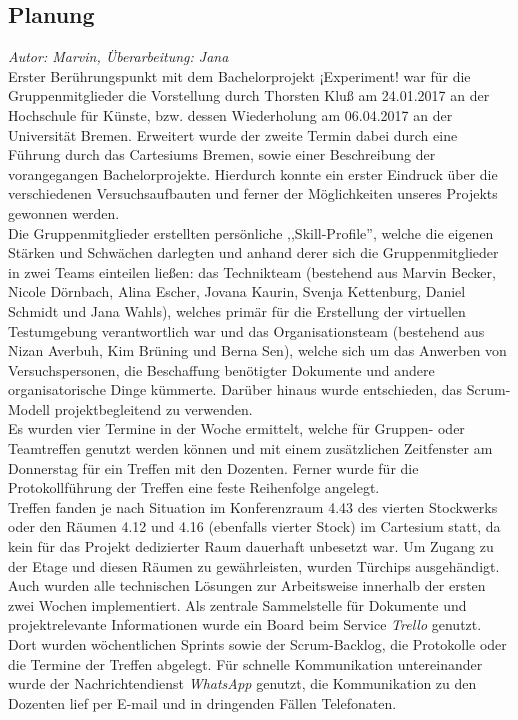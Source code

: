 \documentclass{Bericht}
\begin{document}
\subsection{Planung} %
\textit{Autor: Marvin, Überarbeitung: Jana}\\
		Erster Berührungspunkt mit dem Bachelorprojekt ¡Experiment! war für die Gruppenmitglieder die Vorstellung durch Thorsten Kluß am 24.01.2017 an der Hochschule für Künste, bzw. dessen Wiederholung am 06.04.2017 an der Universität Bremen. Erweitert wurde der zweite Termin dabei durch eine Führung durch das Cartesiums Bremen, sowie einer Beschreibung der vorangegangen Bachelorprojekte. Hierdurch konnte ein erster Eindruck über die verschiedenen Versuchsaufbauten und ferner der Möglichkeiten unseres Projekts gewonnen werden.\\
Die Gruppenmitglieder erstellten persönliche ,,Skill-Profile'', welche die eigenen Stärken und Schwächen darlegten und anhand derer sich die Gruppenmitglieder in zwei Teams einteilen ließen: das Technikteam (bestehend aus Marvin Becker, Nicole Dörnbach, Alina Escher, Jovana Kaurin, Svenja Kettenburg, Daniel Schmidt und Jana Wahls), welches primär für die Erstellung der virtuellen Testumgebung verantwortlich war und das Organisationsteam (bestehend aus Nizan Averbuh, Kim Brüning und Berna Sen), welche sich um das Anwerben von Versuchspersonen, die Beschaffung benötigter Dokumente und andere organisatorische Dinge kümmerte.
Darüber hinaus wurde entschieden, das Scrum-Modell projektbegleitend zu verwenden.\\
Es wurden vier Termine in der Woche ermittelt, welche für Gruppen- oder Teamtreffen genutzt werden können und mit einem zusätzlichen Zeitfenster am Donnerstag für ein Treffen mit den Dozenten. Ferner wurde für die Protokollführung der Treffen eine feste Reihenfolge angelegt.\\
Treffen fanden je nach Situation im Konferenzraum 4.43 des vierten Stockwerks oder den Räumen 4.12 und 4.16 (ebenfalls vierter Stock) im Cartesium statt, da kein für das Projekt dedizierter Raum dauerhaft unbesetzt war. Um Zugang zu der Etage und diesen Räumen zu gewährleisten, wurden Türchips ausgehändigt.\\
Auch wurden alle technischen Lösungen zur Arbeitsweise innerhalb der ersten zwei Wochen implementiert. Als zentrale Sammelstelle für Dokumente und projektrelevante Informationen wurde ein Board beim Service \textit{Trello} genutzt. Dort wurden wöchentlichen Sprints sowie der Scrum-Backlog, die Protokolle oder die Termine der Treffen abgelegt. Für schnelle Kommunikation untereinander wurde der Nachrichtendienst \textit{WhatsApp} genutzt, die Kommunikation zu den Dozenten lief per E-mail und in dringenden Fällen Telefonaten.\\
\end{document}

